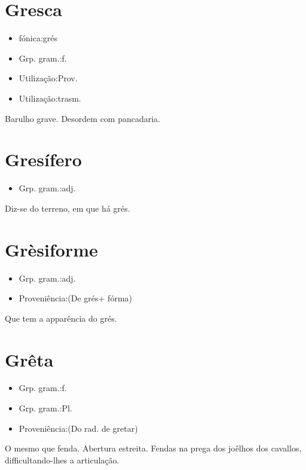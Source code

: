 \section{Gresca}
\begin{itemize}
\item {fónica:grés}
\end{itemize}
\begin{itemize}
\item {Grp. gram.:f.}
\end{itemize}
\begin{itemize}
\item {Utilização:Prov.}
\end{itemize}
\begin{itemize}
\item {Utilização:trasm.}
\end{itemize}
Barulho grave.
Desordem com pancadaria.
\section{Gresífero}
\begin{itemize}
\item {Grp. gram.:adj.}
\end{itemize}
Diz-se do terreno, em que há grés.
\section{Grèsiforme}
\begin{itemize}
\item {Grp. gram.:adj.}
\end{itemize}
\begin{itemize}
\item {Proveniência:(De \textunderscore grés\textunderscore  + \textunderscore fórma\textunderscore )}
\end{itemize}
Que tem a apparência do grés.
\section{Grêta}
\begin{itemize}
\item {Grp. gram.:f.}
\end{itemize}
\begin{itemize}
\item {Grp. gram.:Pl.}
\end{itemize}
\begin{itemize}
\item {Proveniência:(Do rad. de \textunderscore gretar\textunderscore )}
\end{itemize}
O mesmo que \textunderscore fenda\textunderscore .
Abertura estreita.
Fendas na prega dos joêlhos dos cavallos, difficultando-lhes a articulação.
